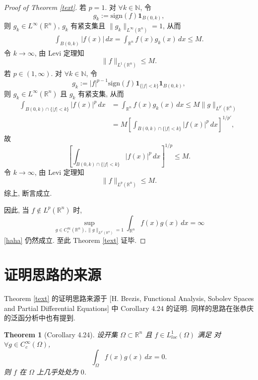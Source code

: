 \documentclass[a4paper,11pt]{article}
\newtheorem{theorem}{Theorem}[section]
\theoremstyle{definition}
\begin{document}
\begin{CJK*}{UTF8}{gbsn}
\begin{proof}[Proof of Theorem \ref{text}]
    若 $ p = 1 $. 对 $ \forall k \in \mathbb{N} $, 令
    $$
        g_k := \mathrm{sign} (f) \mathbf{1}_{B(0, k)},
    $$
    则 $ g_k \in L^\infty(\mathbb{R}^n) $, $ g_k $ 有紧支集且 $ \|g_k\|_{L^\infty(\mathbb{R}^n)} = 1 $, 从而
    \begin{align*}
        \int_{B(0, k)} |f(x)| \, dx
            = \int_{\mathbb{R}^n} f(x) g_k(x) \, dx
            \leq M.
    \end{align*}
    令 $ k \to \infty $, 由 Levi 定理知
    $$
        \| f \|_{L^1(\mathbb{R}^n)} \leq M.
    $$
    若 $ p \in (1, \infty) $. 对 $ \forall k \in \mathbb{N} $, 令
    $$
        g_k := |f|^{p-1} \mathrm{sign}(f) \mathbf{1}_{\{|f| < k\}} \mathbf{1}_{B(0, k)},
    $$
    则 $ g_k \in L^\infty(\mathbb{R}^n) $ 且 $ g_k $ 有紧支集, 从而
    \begin{align*}
        \int_{B(0, k) \cap \{|f| < k\}} |f(x)|^p \, dx
            &= \int_{\mathbb{R}^n} f(x) g_k(x) \, dx
            \leq M \| g \|_{L^{p'}(\mathbb{R}^n)} \\
            &= M \left[ \int_{B(0, k) \cap \{|f| < k\}} |f(x)|^p \, dx \right]^{1/p'},
    \end{align*}
    故
    $$
        \left[ \int_{B(0, k) \cap \{|f| < k\}} |f(x)|^p \, dx \right]^{1/p} \leq M.
    $$
    令 $ k \to \infty $, 由 Levi 定理知
    $$
        \| f \|_{L^p(\mathbb{R}^n)} \leq M.
    $$
    综上, 断言成立.
    
    因此, 当 $ f \notin L^p(\mathbb{R}^n) $ 时,
    $$
        \sup_{g \in C_c^\infty(\mathbb{R}^n), \| g \|_{L^{p'}(\mathbb{R}^n)} = 1} 
            \int_{\mathbb{R}^n} f(x) g(x) \, dx = \infty
    $$
    \eqref{haha} 仍然成立. 至此 Theorem \ref{text} 证毕.
\end{proof}

\section{证明思路的来源}

Theorem \ref{text} 的证明思路来源于 [H. Brezis, Functional Analysis, Sobolev Spaces and Partial Differential Equations] 
中 Corollary 4.24 的证明. 同样的思路在张恭庆的泛函分析中也有提到.

\begin{theorem}[Corollary 4.24]
    设开集 $ \Omega \subset \mathbb{R}^n $ 且 $ f \in L^1_{loc}(\Omega) $ 满足
    对 $ \forall g \in C_c^\infty(\Omega) $,
    $$
        \int_\Omega f(x) g(x) \, dx = 0.
    $$
    则 $ f $ 在 $ \Omega $ 上几乎处处为 $ 0 $.
\end{theorem}


\end{CJK*}
\end{document}
